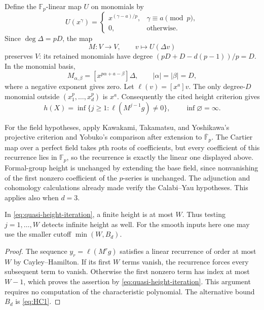 Define the $\mathbb F_p$-linear map $U$ on monomials by
\[
 U(x^\gamma)=
 \begin{cases}
 x^{(\gamma-a)/p},&\gamma\equiv a\pmod p,\\
 0,&\text{otherwise}.
 \end{cases}
\]
Since $\deg\Delta=pD$, the map
\[
 M:V\longrightarrow V,\qquad v\longmapsto U(\Delta v)
\]
preserves $V$: its retained monomials have degree
$(pD+D-d(p-1))/p=D$. In the monomial basis,
\begin{equation}\label{eq:quasi-matrix-entry}
 M_{\alpha,\beta}=[x^{p\alpha+a-\beta}]\Delta,
 \qquad |\alpha|=|\beta|=D,
\end{equation}
where a negative exponent gives zero. Let $\ell(v)=[x^a]v$.
The only degree-$D$ monomial outside $(x_1^p,\ldots,x_d^p)$ is $x^a$.
Consequently the cited height criterion gives
\begin{equation}\label{eq:quasi-height-iteration}
 h(X)=\inf\{j\ge1:\ell(M^{j-1}g)\ne0\},\qquad \inf\varnothing=\infty.
\end{equation}

For the field hypotheses, apply Kawakami, Takamatsu, and Yoshikawa's
projective criterion and Yobuko's
comparison after extension to $\overline{\mathbb F}_p$. The Cartier map
over a perfect field takes $p$th roots of coefficients, but every
coefficient of this recurrence lies in $\mathbb F_p$, so the recurrence
is exactly the linear one displayed above. Formal-group height is
unchanged by extending the base field, since nonvanishing of the first
nonzero coefficient of the $p$-series is unchanged. The adjunction and
cohomology calculations already made verify the Calabi--Yau hypotheses.
This applies also when $d=3$.

\begin{lemma}
\label{lem:quasi-matrix-stopping}
In \eqref{eq:quasi-height-iteration}, a finite height is at most $W$.
Thus testing $j=1,\ldots,W$ detects infinite height as well. For the
smooth inputs here one may use the smaller cutoff $\min(W,B_d)$.
\end{lemma}
\begin{proof}
The sequence $y_r=\ell(M^rg)$ satisfies a linear recurrence of order
at most $W$ by Cayley--Hamilton. If its first $W$ terms vanish, the
recurrence forces every subsequent term to vanish. Otherwise the first
nonzero term has index at most $W-1$, which proves the assertion by
\eqref{eq:quasi-height-iteration}. This argument requires no computation
of the characteristic polynomial. The alternative bound $B_d$ is
\eqref{eq:HC1}.
\end{proof}

